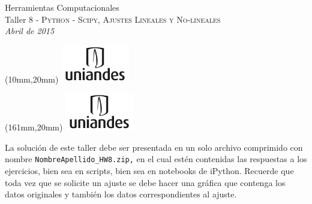 \documentclass[11pt,letterpaper]{exam}
\begin{document}
\begin{center}
{\Large Herramientas Computacionales} \\
Taller 8 - \textsc{Python - Scipy, Ajustes Lineales y No-lineales} \\
{\small \it Abril de 2015}
\end{center}

\begin{textblock*}{40mm}(10mm,20mm)
  \includegraphics[width=3cm]{logoUniandes.pdf}
\end{textblock*}

\begin{textblock*}{40mm}(161mm,20mm)
  \includegraphics[width=3cm]{logoUniandes.pdf}
\end{textblock*}

\vspace{1cm}

La solución de este taller debe ser presentada en un solo archivo comprimido con nombre \verb+NombreApellido_HW8.zip,+ en el cual estén contenidas las respuestas a los ejercicios, bien sea en scripts, bien sea en notebooks de iPython. Recuerde que toda vez que se solicite un ajuste se debe hacer una gráfica que contenga los datos originales y también los datos correspondientes al ajuste.
\end{document}
